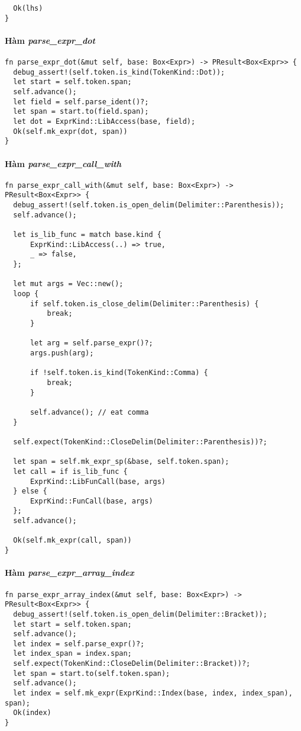 {\begin{lstlisting}
  Ok(lhs)
}
\end{lstlisting}

\paragraph{Hàm \textit{parse\_expr\_dot}}
\label{ap1:expr_dot}
\begin{lstlisting}
fn parse_expr_dot(&mut self, base: Box<Expr>) -> PResult<Box<Expr>> {
  debug_assert!(self.token.is_kind(TokenKind::Dot));
  let start = self.token.span;
  self.advance();
  let field = self.parse_ident()?;
  let span = start.to(field.span);
  let dot = ExprKind::LibAccess(base, field);
  Ok(self.mk_expr(dot, span))
}
\end{lstlisting}

\paragraph{Hàm \textit{parse\_expr\_call\_with}}
\label{ap1:expr_call_with}
\begin{lstlisting}
fn parse_expr_call_with(&mut self, base: Box<Expr>) -> PResult<Box<Expr>> {
  debug_assert!(self.token.is_open_delim(Delimiter::Parenthesis));
  self.advance();

  let is_lib_func = match base.kind {
      ExprKind::LibAccess(..) => true,
      _ => false,
  };

  let mut args = Vec::new();
  loop {
      if self.token.is_close_delim(Delimiter::Parenthesis) {
          break;
      }

      let arg = self.parse_expr()?;
      args.push(arg);

      if !self.token.is_kind(TokenKind::Comma) {
          break;
      }

      self.advance(); // eat comma
  }

  self.expect(TokenKind::CloseDelim(Delimiter::Parenthesis))?;

  let span = self.mk_expr_sp(&base, self.token.span);
  let call = if is_lib_func {
      ExprKind::LibFunCall(base, args)
  } else {
      ExprKind::FunCall(base, args)
  };
  self.advance();

  Ok(self.mk_expr(call, span))
}
\end{lstlisting}

\paragraph{Hàm \textit{parse\_expr\_array\_index}}
\label{ap1:expr_array_index}
\begin{lstlisting}
fn parse_expr_array_index(&mut self, base: Box<Expr>) -> PResult<Box<Expr>> {
  debug_assert!(self.token.is_open_delim(Delimiter::Bracket));
  let start = self.token.span;
  self.advance();
  let index = self.parse_expr()?;
  let index_span = index.span;
  self.expect(TokenKind::CloseDelim(Delimiter::Bracket))?;
  let span = start.to(self.token.span);
  self.advance();
  let index = self.mk_expr(ExprKind::Index(base, index, index_span), span);
  Ok(index)
}
\end{lstlisting}
}

